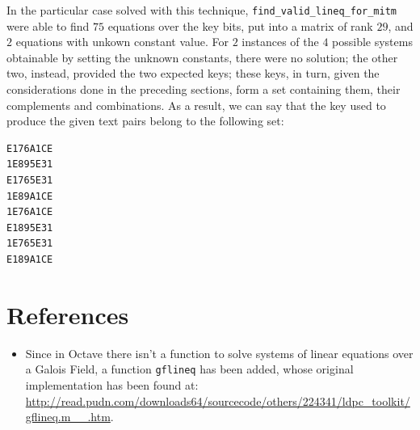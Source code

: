\documentclass[a4paper,12pt,titlepage]{article}
\begin{document}
In the particular case solved with this technique,
\texttt{find\_valid\_lineq\_for\_mitm} were able to find $75$ equations over the
key bits, put into a matrix of rank $29$, and $2$ equations with unkown
constant value. For $2$ instances of the $4$ possible systems obtainable by
setting the unknown constants, there were no solution; the other two, instead,
provided the two expected keys; these keys, in turn, given the considerations
done in the preceding sections, form a set containing them, their complements
and combinations. As a result, we can say that the key used to produce the
given text pairs belong to the following set:
\begin{verbatim}
E176A1CE
1E895E31
E1765E31
1E89A1CE
1E76A1CE
E1895E31
1E765E31
E189A1CE
\end{verbatim}

\section{References}
\begin{itemize}
  \item Since in Octave there isn't a function to solve systems of linear equations
        over a Galois Field, a function \texttt{gflineq} has been added, whose original
        implementation has been found at: \\
        \url{http://read.pudn.com/downloads64/sourcecode/others/224341/ldpc_toolkit/gflineq.m__.htm}.
\end{itemize}
\end{document}
